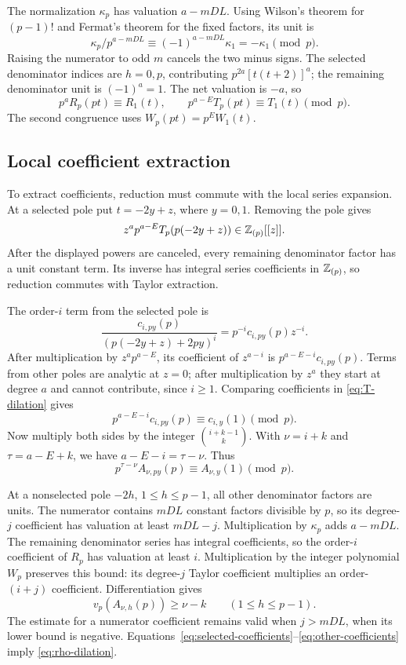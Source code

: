 The normalization $\kappa_p$ has valuation $a-mDL$.
Using Wilson's theorem for $(p-1)!$ and Fermat's theorem for
the fixed factors, its unit is
\[
 \kappa_p/p^{a-mDL}\equiv(-1)^{a-mDL}\kappa_1=-\kappa_1\pmod p.
\]
Raising the numerator to odd $m$ cancels the two minus signs.
The selected denominator indices are $h=0,p$, contributing
$p^{2a}[t(t+2)]^a$; the remaining denominator unit is
$(-1)^a=1$. The net valuation is $-a$, so
\begin{equation}\label{eq:T-dilation}
 p^aR_p(pt)\equiv R_1(t),\qquad
 p^{a-E}T_p(pt)\equiv T_1(t)\pmod p.
\end{equation}
The second congruence uses $W_p(pt)=p^E W_1(t)$.

\subsection{Local coefficient extraction}

To extract coefficients, reduction must commute with the local
series expansion. At a selected pole put $t=-2y+z$, where
$y=0,1$. Removing the pole gives
\[
 z^a p^{a-E}T_p(p(-2y+z))\in\mathbb Z_{(p)}[[z]].
\]
After the displayed powers are canceled, every remaining
denominator factor has a unit constant term. Its inverse has
integral series coefficients in $\mathbb Z_{(p)}$, so reduction commutes
with Taylor extraction.

The order-$i$ term from the selected pole is
\[
 \frac{c_{i,py}(p)}{(p(-2y+z)+2py)^i}
                  =p^{-i}c_{i,py}(p)z^{-i}.
\]
After multiplication by $z^ap^{a-E}$, its coefficient of
$z^{a-i}$ is $p^{a-E-i}c_{i,py}(p)$.
Terms from other poles are analytic at $z=0$; after multiplication
by $z^a$ they start at degree $a$ and cannot contribute, since
$i\ge1$. Comparing coefficients in \eqref{eq:T-dilation} gives
\[
 p^{a-E-i}c_{i,py}(p)\equiv c_{i,y}(1)\pmod p.
\]
Now multiply both sides by the integer $\binom{i+k-1}{k}$.
With $\nu=i+k$ and $\tau=a-E+k$, we have
$a-E-i=\tau-\nu$. Thus
\begin{equation}\label{eq:selected-coefficients}
 p^{\tau-\nu}A_{\nu,py}(p)\equiv A_{\nu,y}(1)\pmod p.
\end{equation}

At a nonselected pole $-2h$, $1\le h\le p-1$, all other
denominator factors are units. The numerator contains $mDL$
constant factors divisible by $p$, so its degree-$j$
coefficient has valuation at least $mDL-j$.
Multiplication by $\kappa_p$ adds $a-mDL$. The remaining denominator
series has integral coefficients, so the order-$i$ coefficient
of $R_p$ has valuation at least $i$.
Multiplication by the integer polynomial $W_p$ preserves this
bound: its degree-$j$ Taylor coefficient multiplies an
order-$(i+j)$ coefficient. Differentiation gives
\begin{equation}\label{eq:other-coefficients}
 v_p(A_{\nu,h}(p))\ge\nu-k\qquad(1\le h\le p-1).
\end{equation}
The estimate for a numerator coefficient remains valid when
$j>mDL$, when its lower bound is negative.
Equations~\eqref{eq:selected-coefficients}--\eqref{eq:other-coefficients}
imply \eqref{eq:rho-dilation}.

